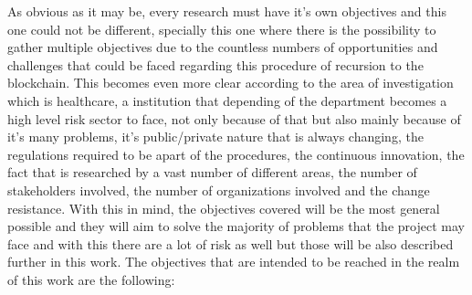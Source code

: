 As obvious as it may be, every research must have it's own objectives and this one could not be different, specially this one where there is the possibility to gather multiple objectives due to the countless numbers of opportunities and challenges that could be faced regarding this procedure of recursion to the blockchain. This becomes even more clear according to the area of investigation which is healthcare, a institution that depending of the department becomes a high level risk sector to face, not only because of that but also mainly because of it's many problems, it's public/private nature that is always changing, the regulations required to be apart of the procedures, the continuous innovation, the fact that is researched by a vast number of different areas, the number of stakeholders involved, the number of organizations involved and the change resistance. With this in mind, the objectives covered will be the most general possible and they will aim to solve the majority of problems that the project may face and with this there are a lot of risk as well but those will be also described further in this work. The objectives that are intended to be reached in the realm of this work are the following:

